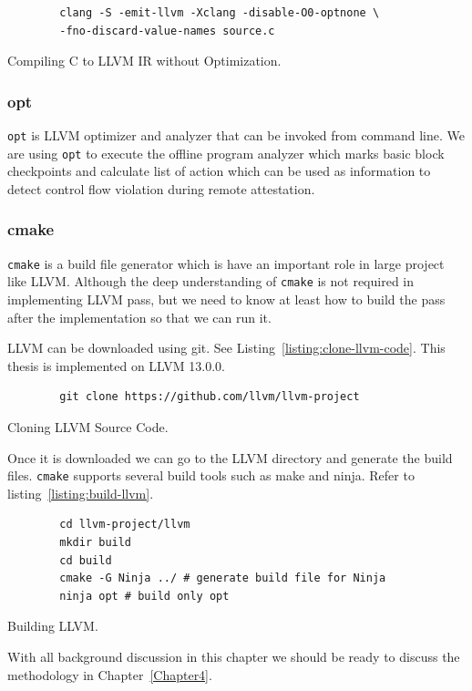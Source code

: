 \begin{listing}[htbp]
    \begin{verbatim}
        clang -S -emit-llvm -Xclang -disable-O0-optnone \
        -fno-discard-value-names source.c
    \end{verbatim}
    \caption{Compiling C to LLVM IR without Optimization.}    
    \label{listing:compile-llvm-to-ir-no-opt}
\end{listing}

\subsubsection{opt}

\texttt{opt} is LLVM optimizer and analyzer that can be invoked from command
line. We are using \texttt{opt} to execute the offline program analyzer which
marks basic block checkpoints and calculate list of action which can be used as
information to detect control flow violation during remote attestation.

\subsubsection{cmake}

\texttt{cmake} is a build file generator which is have an important role in
large project like LLVM. Although the deep understanding of \texttt{cmake} is
not required in implementing LLVM pass, but we need to know at least how to
build the pass after the implementation so that we can run it.

LLVM can be downloaded using git. See Listing~\ref{listing:clone-llvm-code}.
This thesis is implemented on LLVM 13.0.0.

\begin{listing}[htbp]
    \begin{verbatim}
        git clone https://github.com/llvm/llvm-project
    \end{verbatim}
    \caption{Cloning LLVM Source Code.}    
    \label{listing:clone-llvm-code}
\end{listing}

Once it is downloaded we can go to the LLVM directory and generate the build
files. \texttt{cmake} supports several build tools such as make and ninja. Refer
to listing~\ref{listing:build-llvm}.

\begin{listing}[htbp]
    \begin{verbatim}
        cd llvm-project/llvm
        mkdir build
        cd build
        cmake -G Ninja ../ # generate build file for Ninja
        ninja opt # build only opt
    \end{verbatim}
    \caption{Building LLVM.}    
    \label{listing:build-llvm}
\end{listing}

With all background discussion in this chapter we should be ready to discuss the
methodology in Chapter~\ref{Chapter4}.